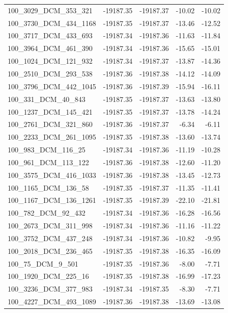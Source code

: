 \documentclass[journal=jacsat,manuscript=article]{achemso}
\begin{document}
\begin{table}[b!]
\begin{tabular}{lrrrr}
100\_3029\_DCM\_353\_321  & -19187.35 & -19187.37 &  -10.02 & -10.02 \\
100\_3730\_DCM\_434\_1168 & -19187.35 & -19187.37 &  -13.46 & -12.52 \\
100\_3717\_DCM\_433\_693  & -19187.34 & -19187.36 &  -11.63 & -11.84 \\
100\_3964\_DCM\_461\_390  & -19187.34 & -19187.36 &  -15.65 & -15.01 \\
100\_1024\_DCM\_121\_932  & -19187.34 & -19187.37 &  -13.87 & -14.36 \\
100\_2510\_DCM\_293\_538  & -19187.36 & -19187.38 &  -14.12 & -14.09 \\
100\_3796\_DCM\_442\_1045 & -19187.36 & -19187.39 &  -15.94 & -16.11 \\
100\_331\_DCM\_40\_843    & -19187.35 & -19187.37 &  -13.63 & -13.80 \\
100\_1237\_DCM\_145\_421  & -19187.35 & -19187.37 &  -13.78 & -14.24 \\
100\_2761\_DCM\_321\_860  & -19187.36 & -19187.37 &   -6.34 &  -6.11 \\
100\_2233\_DCM\_261\_1095 & -19187.35 & -19187.38 &  -13.60 & -13.74 \\
100\_983\_DCM\_116\_25    & -19187.34 & -19187.36 &  -11.19 & -10.28 \\
100\_961\_DCM\_113\_122   & -19187.36 & -19187.38 &  -12.60 & -11.20 \\
100\_3575\_DCM\_416\_1033 & -19187.36 & -19187.38 &  -13.45 & -12.73 \\
100\_1165\_DCM\_136\_58   & -19187.35 & -19187.37 &  -11.35 & -11.41 \\
100\_1167\_DCM\_136\_1261 & -19187.35 & -19187.39 &  -22.10 & -21.81 \\
100\_782\_DCM\_92\_432    & -19187.34 & -19187.36 &  -16.28 & -16.56 \\
100\_2673\_DCM\_311\_998  & -19187.34 & -19187.36 &  -11.16 & -11.22 \\
100\_3752\_DCM\_437\_248  & -19187.34 & -19187.36 &  -10.82 &  -9.95 \\
100\_2018\_DCM\_236\_465  & -19187.35 & -19187.38 &  -16.35 & -16.09 \\
100\_75\_DCM\_9\_501      & -19187.35 & -19187.36 &   -8.00 &  -7.71 \\
100\_1920\_DCM\_225\_16   & -19187.35 & -19187.38 &  -16.99 & -17.23 \\
100\_3236\_DCM\_377\_983  & -19187.34 & -19187.35 &   -8.30 &  -7.71 \\
100\_4227\_DCM\_493\_1089 & -19187.36 & -19187.38 &  -13.69 & -13.08 \\

\end{tabular}
\end{table}
\end{document}
